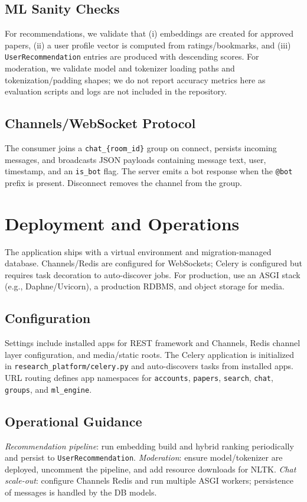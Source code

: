 \documentclass[conference]{IEEEtran}
\begin{document}
\subsection{ML Sanity Checks}
For recommendations, we validate that (i) embeddings are created for approved papers, (ii) a user profile vector is computed from ratings/bookmarks, and (iii) \texttt{UserRecommendation} entries are produced with descending scores. For moderation, we validate model and tokenizer loading paths and tokenization/padding shapes; we do not report accuracy metrics here as evaluation scripts and logs are not included in the repository.

\subsection{Channels/WebSocket Protocol}
The consumer joins a \texttt{chat\_\{room\_id\}} group on connect, persists incoming messages, and broadcasts JSON payloads containing message text, user, timestamp, and an \texttt{is\_bot} flag. The server emits a bot response when the \texttt{@bot} prefix is present. Disconnect removes the channel from the group.

\section{Deployment and Operations}
The application ships with a virtual environment and migration-managed database. Channels/Redis are configured for WebSockets; Celery is configured but requires task decoration to auto-discover jobs. For production, use an ASGI stack (e.g., Daphne/Uvicorn), a production RDBMS, and object storage for media.

\subsection{Configuration}
Settings include installed apps for REST framework and Channels, Redis channel layer configuration, and media/static roots. The Celery application is initialized in \texttt{research\_platform/celery.py} and auto-discovers tasks from installed apps. URL routing defines app namespaces for \texttt{accounts}, \texttt{papers}, \texttt{search}, \texttt{chat}, \texttt{groups}, and \texttt{ml\_engine}.

\subsection{Operational Guidance}
\textit{Recommendation pipeline}: run embedding build and hybrid ranking periodically and persist to \texttt{UserRecommendation}.\newline
\textit{Moderation}: ensure model/tokenizer are deployed, uncomment the pipeline, and add resource downloads for NLTK.\newline
\textit{Chat scale-out}: configure Channels Redis and run multiple ASGI workers; persistence of messages is handled by the DB models.
\end{document}
